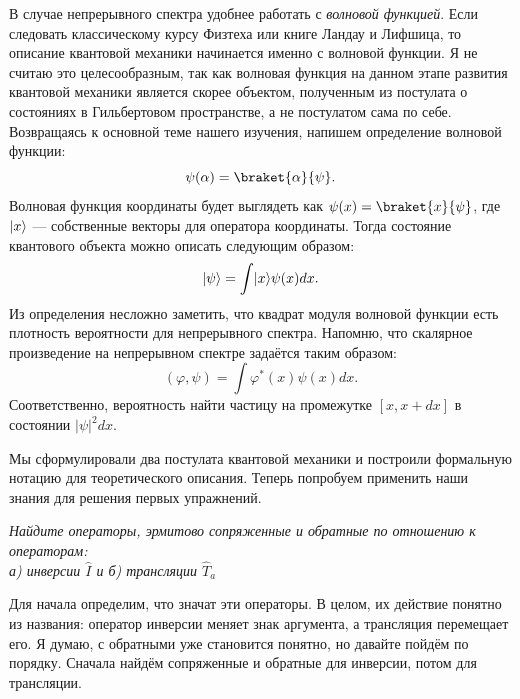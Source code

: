 В случае непрерывного спектра удобнее работать с \textit{волновой функцией}.
Если следовать классическому курсу Физтеха или книге Ландау и Лифшица, то
описание квантовой механики начинается именно с волновой функции. Я не считаю
это целесообразным, так как волновая функция на данном этапе развития квантовой
механики является скорее объектом, полученным из постулата о состояниях в
Гильбертовом пространстве, а не постулатом сама по себе. Возвращаясь к основной
теме нашего изучения, напишем определение волновой функции:
\[
  \psi(\alpha) = \braket{\alpha}{\psi}.
\]
Волновая функция координаты будет выглядеть как $\psi(x) = \braket{x}{\psi}$,
где $\lvert x\rangle$ --- собственные векторы для оператора координаты. Тогда состояние
квантового объекта можно описать следующим образом:
\[
  \lvert\psi\rangle = \int\lvert x\rangle\psi(x)dx.
\]
Из определения несложно заметить, что квадрат модуля волновой функции есть
плотность вероятности для непрерывного спектра. Напомню, что скалярное
произведение на непрерывном спектре задаётся таким образом:
\[
  (\varphi, \psi) = \int \varphi^*(x) \psi(x) dx.
\]
Соответственно, вероятность найти частицу на промежутке $[x, x+dx]$ в состоянии
$|\psi|^2dx$.

Мы сформулировали два постулата квантовой механики и построили формальную
нотацию для теоретического описания. Теперь попробуем применить наши знания для
решения первых упражнений.
\begin{exercise}
  \textit{Найдите операторы, эрмитово сопряженные и обратные по отношению к
    операторам:\\ а) инверсии $\hat I$ и б) трансляции $\hat T_a$}
\end{exercise}
Для начала определим, что значат эти операторы. В целом, их действие понятно из
названия: оператор инверсии меняет знак аргумента, а трансляция перемещает его.
Я думаю, с обратными уже становится понятно, но давайте пойдём по порядку.
Сначала найдём сопряженные и обратные для инверсии, потом для трансляции.

